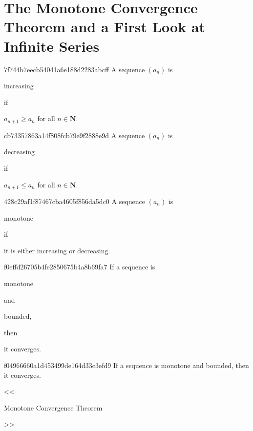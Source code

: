 


\section{The Monotone Convergence Theorem and a First Look at Infinite Series} %
\begin{note}{7f744b7eecb54041a6e188d2283abcff}
    A sequence \({ (a_n) }\) is \begin{icloze}{2}increasing\end{icloze} if \begin{icloze}{1}\({ a_{n + 1} \geq a_n }\) for all \({ n \in \mathbf{N} }\).\end{icloze}
\end{note}

\begin{note}{cb73357863a14f808fcb79e9f2888e9d}
    A sequence \({ (a_n) }\) is \begin{icloze}{2}decreasing\end{icloze} if \begin{icloze}{1}\({ a_{n + 1} \leq a_n }\) for all \({ n \in \mathbf{N} }\).\end{icloze}
\end{note}

\begin{note}{428c29af1f87467cba4605f856da5dc0}
    A sequence \({ (a_n) }\) is \begin{icloze}{2}monotone\end{icloze} if \begin{icloze}{1}it is either increasing or decreasing.\end{icloze}
\end{note}

\begin{note}{f0effd26705b4fe2850675b4a8b69fa7}
    If a sequence is \begin{icloze}{3}monotone\end{icloze} and \begin{icloze}{2}bounded,\end{icloze} then \begin{icloze}{1}it converges.\end{icloze}
\end{note}

\begin{note}{f04966660a1d453499de164d33c3efd9}
    If a sequence is monotone and bounded, then it converges.

    \begin{center}
        \tiny
        <<\begin{icloze}{1}Monotone Convergence Theorem\end{icloze}>>
    \end{center}
\end{note}

